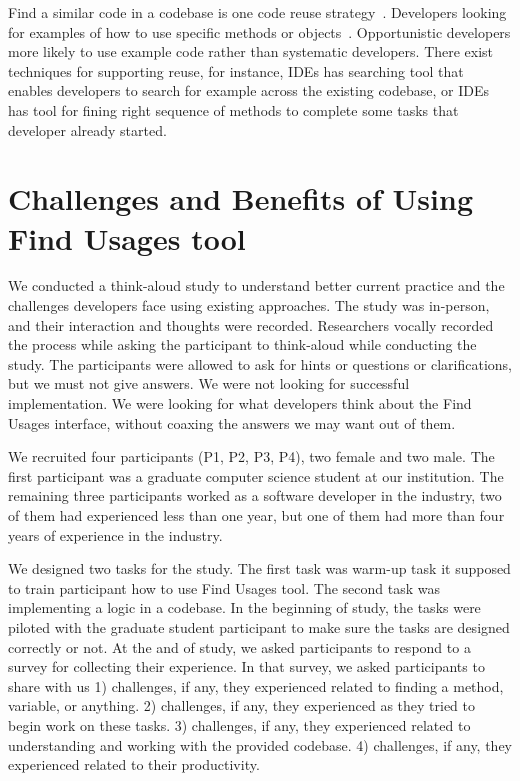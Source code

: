 \documentclass[conference]{IEEEtran}
\begin{document}
Find a similar code in a codebase is one code reuse strategy~\cite{rosson1996reuse}. Developers looking for examples of how to use specific methods or objects~\cite{stylos2006mica,umarji2008archetypal}. Opportunistic developers more likely to use example code rather than systematic developers. There exist techniques for supporting reuse, for instance, IDEs has searching tool that enables developers to search for example across the existing codebase, or IDEs has tool for fining right sequence of methods to complete some tasks that developer already started.\par



\section{Challenges and Benefits of Using Find Usages tool}
We conducted a think-aloud study to understand better current practice and the challenges developers face using existing approaches. The study was in-person, and their interaction and thoughts were recorded. Researchers vocally recorded the process while asking the participant to think-aloud while conducting the study. The participants were allowed to ask for hints or questions or clarifications, but we must not give answers. We were not looking for successful implementation. We were looking for what developers think about the Find Usages interface, without coaxing the answers we may want out of them.\par
We recruited four participants (P1, P2, P3, P4), two female and two male. The first participant was a graduate computer science student at our institution. The remaining three participants worked as a software developer in the industry, two of them had experienced less than one year, but one of them had more than four years of experience in the industry.\par 
We designed two tasks for the study. The first task was warm-up task it supposed to train participant how to use Find Usages tool. The second task was implementing a logic in a codebase. In the beginning of study, the tasks were piloted with the graduate student participant to make sure the tasks are designed correctly or not. At the and of study, we asked participants to respond to a survey for collecting their experience. In that survey, we asked participants to share with us 1) challenges, if any, they experienced related to finding a method, variable, or anything. 2) challenges, if any, they experienced as they tried to begin work on these tasks. 3) challenges, if any, they experienced related to understanding and working with the provided codebase. 4) challenges, if any, they experienced related to their productivity.
\end{document}
